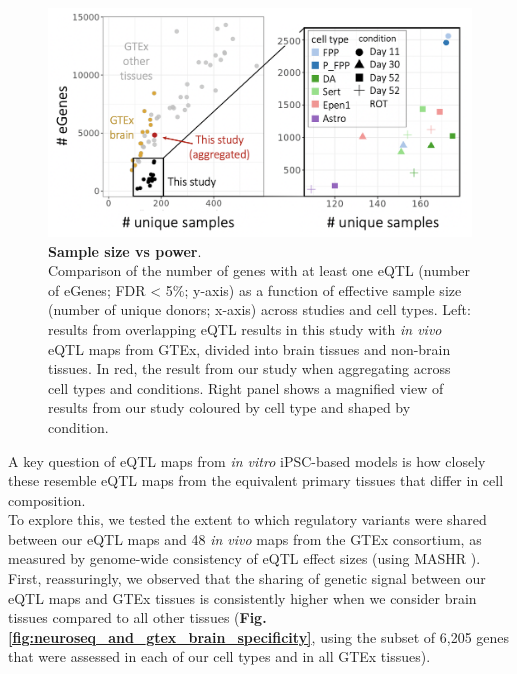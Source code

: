 
\begin{figure}[h]
\centering
\includegraphics[width=16cm]{Chapter5/Fig/neuroseq_eqtl_gtex_scatterplot.png}
\caption[Sample size vs power]{\textbf{Sample size vs power}.\\
Comparison of the number of genes with at least one eQTL (number of eGenes; FDR < 5\%; y-axis) as a function of effective sample size (number of unique donors; x-axis) across studies and cell types. 
Left: results from overlapping eQTL results in this study with \textit{in vivo} eQTL maps from GTEx, divided into brain tissues and non-brain tissues. 
In red, the result from our study when aggregating across cell types and conditions. 
Right panel shows a magnified view of results from our study coloured by cell type and shaped by condition.}
\label{fig:neuroseq_and_gtex_power}
\end{figure}

\newpage


A key question of eQTL maps from \textit{in vitro} iPSC-based models is how closely these resemble eQTL maps from the equivalent primary tissues that differ in cell composition. \\ 

To explore this, we tested the extent to which regulatory variants were shared between our eQTL maps and 48 
\textit{in vivo} maps from the GTEx consortium, 
as measured by genome-wide consistency of eQTL effect sizes (using MASHR \cite{urbut2019flexible}).
First, reassuringly, we observed that the sharing of genetic signal between our eQTL maps and GTEx tissues is consistently higher when we consider brain tissues compared to all other tissues (\textbf{Fig. \ref{fig:neuroseq_and_gtex_brain_specificity}}, using the subset of 6,205 genes that were assessed in each of our cell types and in all GTEx tissues). 
\\

